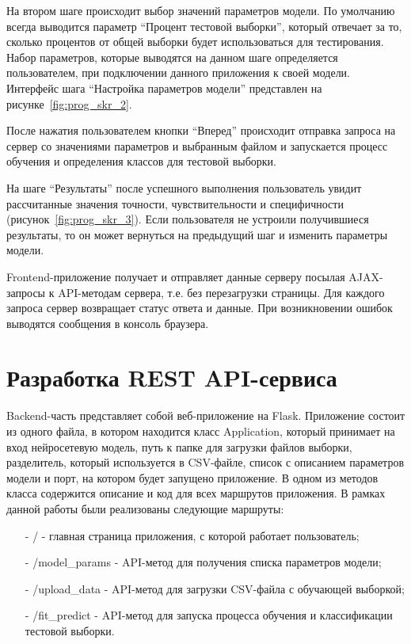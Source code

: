 

На втором шаге происходит выбор значений параметров модели. По умолчанию всегда выводится параметр “Процент тестовой выборки”, который отвечает за то, сколько процентов от общей выборки будет использоваться для тестирования. Набор параметров, которые выводятся на данном шаге определяется пользователем, при подключении данного приложения к своей модели. Интерфейс шага “Настройка параметров модели” представлен на рисунке~\ref{fig:prog_skr_2}.




После нажатия пользователем кнопки “Вперед” происходит отправка запроса на сервер со значениями параметров и выбранным файлом и запускается процесс обучения и определения классов для тестовой выборки.


На шаге “Результаты” после успешного выполнения пользователь увидит рассчитанные значения точности, чувствительности и специфичности (рисунок~\ref{fig:prog_skr_3}). Если пользователя не устроили получившиеся результаты, то он может вернуться на предыдущий шаг и изменить параметры модели.




Frontend-приложение получает и отправляет данные серверу посылая AJAX-запросы к API-методам сервера, т.е. без перезагрузки страницы. Для каждого запроса сервер возвращает статус ответа и данные. При возникновении ошибок выводятся сообщения в консоль браузера.

\section{Разработка REST API-сервиса}

Backend-часть представляет собой веб-приложение на Flask. Приложение состоит из одного файла, в котором находится класс Application, который принимает на вход нейросетевую модель, путь к папке для загрузки файлов выборки, разделитель, который используется в CSV-файле, список с описанием параметров модели и порт, на котором будет запущено приложение. В одном из методов класса содержится описание и код для всех маршрутов приложения. В рамках данной работы были реализованы следующие маршруты:
\begin{itemize}
	\item[-] / - главная страница приложения, с которой работает пользователь;
	\item[-] /model\_params - API-метод для получения списка параметров модели;
	\item[-] /upload\_data - API-метод для загрузки CSV-файла с обучающей выборкой;
	\item[-] /fit\_predict - API-метод для запуска процесса обучения и классификации тестовой выборки.
\end{itemize}



